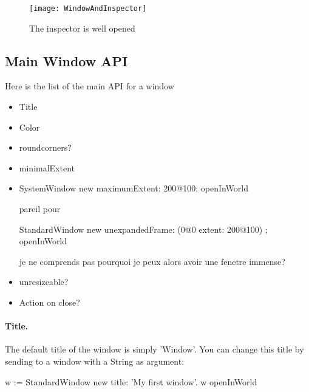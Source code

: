 \documentclass[a4paper,10pt,twoside]{book}
\begin{document}
\begin{figure}[ht]
\begin{center}
	\texttt{[image: WindowAndInspector]}
	\caption{The inspector is well opened}
\end{center}
\end{figure}

\subsection{Main Window API}

 Here is the list of the main API for a window

\begin{itemize}
\item Title
\item Color
\item roundcorners?
\item minimalExtent
\item 

\begin{code}{}
SystemWindow new
	maximumExtent: 200@100; openInWorld

pareil pour 

StandardWindow new
	unexpandedFrame: (0@0 extent: 200@100) ; openInWorld
\end{code}

je ne comprends pas pourquoi je peux alors avoir une fenetre immense? 

\item unresizeable? 
\item Action on close? 
\end{itemize}

\paragraph*{Title.}
The default title of the window is simply 'Window'. You can change this title by sending  to a window with a String as argument:
\begin{code}{}
w := StandardWindow new title: 'My first window'.
w openInWorld
\end{code}
\end{document}
